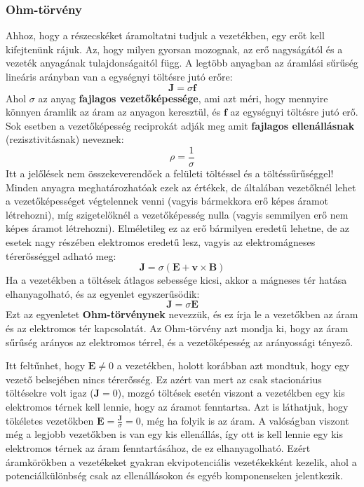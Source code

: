 \documentclass[../main.tex]{subfiles}
\begin{document}
\subsubsection{Ohm-törvény}
Ahhoz, hogy a részecskéket áramoltatni tudjuk a vezetékben, egy erőt kell kifejtenünk rájuk. Az, hogy milyen gyorsan mozognak, az erő nagyságától és a vezeték anyagának tulajdonságaitól függ.
A legtöbb anyagban az áramlási sűrűség lineáris arányban van a egységnyi töltésre jutó erőre:
\begin{equation}
    \mathbf{J} = \sigma \mathbf{f}
\end{equation}
Ahol $\sigma$ az anyag \textbf{fajlagos vezetőképessége}, ami azt méri, hogy mennyire könnyen áramlik az áram az anyagon keresztül, és $\mathbf{f}$ az egységnyi töltésre jutó erő.
Sok esetben a vezetőképesség reciprokát adják meg amit \textbf{fajlagos ellenállásnak} (rezisztivitásnak) neveznek:
\begin{equation}
    \rho = \frac{1}{\sigma}
\end{equation}
Itt a jelőlések nem összekeverendőek a felületi töltéssel és a töltéssűrűséggel! Minden anyagra meghatározhatóak ezek az értékek, de általában vezetőknél lehet a vezetőképességet végtelennek venni (vagyis bármekkora erő képes áramot létrehozni), míg szigetelőknél a vezetőképesség nulla (vagyis semmilyen erő nem képes áramot létrehozni).
Elméletileg ez az erő bármilyen eredetű lehetne, de az esetek nagy részében elektromos eredetű lesz, vagyis az elektromágneses térerősséggel adható meg:
\begin{equation}
    \mathbf{J} = \sigma (\mathbf{E} + \mathbf{v} \times \mathbf{B})
\end{equation}
Ha a vezetékben a töltések átlagos sebessége kicsi, akkor a mágneses tér hatása elhanyagolható, és az egyenlet egyszerűsödik:
\begin{equation}
    \boxed{\mathbf{J} = \sigma \mathbf{E}}
\end{equation}
Ezt az egyenletet \textbf{Ohm-törvénynek} nevezzük, és ez írja le a vezetőkben az áram és az elektromos tér kapcsolatát. Az Ohm-törvény azt mondja ki, hogy az áram sűrűség arányos az elektromos térrel, és a vezetőképesség az arányossági tényező.

Itt feltűnhet, hogy $\mathbf{E} \neq 0$ a vezetékben, holott korábban azt mondtuk, hogy egy vezető belsejében nincs térerősség. Ez azért van mert az csak stacionárius töltésekre volt igaz ($\mathbf{J} = 0$), mozgó töltések esetén viszont a vezetékben egy kis elektromos térnek kell lennie, hogy az áramot fenntartsa.
Azt is láthatjuk, hogy tökéletes vezetőkben $\mathbf{E} = \frac{\mathbf{J}}{\sigma} = 0$, még ha folyik is az áram. A valóságban viszont még a legjobb vezetőkben is van egy kis ellenállás, így ott is kell lennie egy kis elektromos térnek az áram fenntartásához, de ez elhanyagolható.
Ezért áramkörökben a vezetékeket gyakran ekvipotenciális vezetékekként kezelik, ahol a potenciálkülönbség csak az ellenállásokon és egyéb komponenseken jelentkezik.
\end{document}
